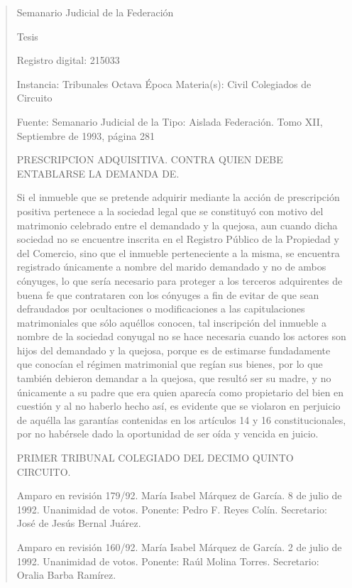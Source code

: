 \documentclass[11pt,a4paper]{article}
\begin{document}
\begin{quote}
                                                   Semanario Judicial de la Federación

                                                  Tesis

 Registro digital: 215033

 Instancia: Tribunales             Octava Época                          Materia(s): Civil
 Colegiados de Circuito

                                   Fuente: Semanario Judicial de la      Tipo: Aislada
                                   Federación.
                                   Tomo XII, Septiembre de 1993,
                                   página 281


PRESCRIPCION ADQUISITIVA. CONTRA QUIEN DEBE ENTABLARSE LA DEMANDA DE.


Si el inmueble que se pretende adquirir mediante la acción de prescripción positiva pertenece a la
sociedad legal que se constituyó con motivo del matrimonio celebrado entre el demandado y la
quejosa, aun cuando dicha sociedad no se encuentre inscrita en el Registro Público de la Propiedad
y del Comercio, sino que el inmueble perteneciente a la misma, se encuentra registrado únicamente
a nombre del marido demandado y no de ambos cónyuges, lo que sería necesario para proteger a
los terceros adquirentes de buena fe que contrataren con los cónyuges a fin de evitar de que sean
defraudados por ocultaciones o modificaciones a las capitulaciones matrimoniales que sólo aquéllos
conocen, tal inscripción del inmueble a nombre de la sociedad conyugal no se hace necesaria
cuando los actores son hijos del demandado y la quejosa, porque es de estimarse fundadamente
que conocían el régimen matrimonial que regían sus bienes, por lo que también debieron demandar
a la quejosa, que resultó ser su madre, y no únicamente a su padre que era quien aparecía como
propietario del bien en cuestión y al no haberlo hecho así, es evidente que se violaron en perjuicio
de aquélla las garantías contenidas en los artículos 14 y 16 constitucionales, por no habérsele dado
la oportunidad de ser oída y vencida en juicio.

PRIMER TRIBUNAL COLEGIADO DEL DECIMO QUINTO CIRCUITO.


Amparo en revisión 179/92. María Isabel Márquez de García. 8 de julio de 1992. Unanimidad de
votos. Ponente: Pedro F. Reyes Colín. Secretario: José de Jesús Bernal Juárez.

Amparo en revisión 160/92. María Isabel Márquez de García. 2 de julio de 1992. Unanimidad de
votos. Ponente: Raúl Molina Torres. Secretario: Oralia Barba Ramírez.


\end{quote}
\end{document}
